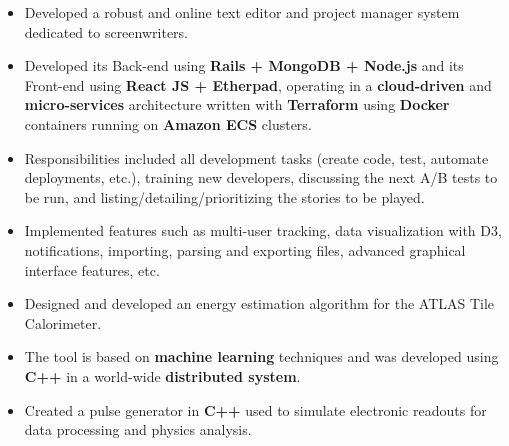 \documentclass[10pt,a4paper,ragged2e]{altacv}
\begin{document}
\divider%

\begin{itemize}
\item Developed a robust and online text editor and project manager system dedicated to screenwriters.
\item Developed its Back-end using \textbf{Rails + MongoDB + Node.js} and its Front-end using \textbf{React JS + Etherpad}, operating in a \textbf{cloud-driven} and \textbf{micro-services} architecture written with \textbf{Terraform} using \textbf{Docker} containers running on \textbf{Amazon ECS} clusters.
\item Responsibilities included all development tasks (create code, test, automate deployments, etc.), training new developers, discussing the next A/B tests to be run, and listing/detailing/prioritizing the stories to be played.
\item Implemented features such as multi-user tracking, data visualization with D3, notifications, importing, parsing and exporting files, advanced graphical interface features, etc.
\end{itemize}

\divider%



\begin{itemize}
	\item Designed and developed an energy estimation algorithm for the ATLAS Tile Calorimeter.
	\item The tool is based on \textbf{machine learning} techniques and was developed using \textbf{C++} in a world-wide \textbf{distributed system}.
	\item Created a pulse generator in \textbf{C++} used to simulate electronic readouts for data processing and physics analysis.
\end{itemize}
\end{document}
